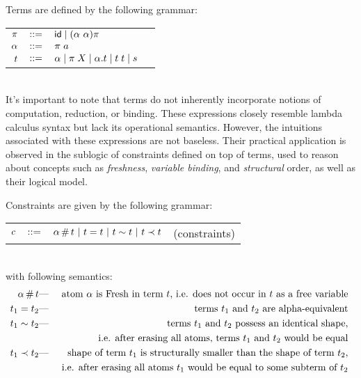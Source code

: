 \documentclass[english, mgr]{iithesis}
\renewcommand{\it}[1]{\textit{#1}}
\begin{document}
Terms are defined by the following grammar:
\\
\begin{tabular}{rclr}
    $\pi$    & $::=$ & $\mathsf{id} \mid (\alpha\ \alpha) \pi$ \\
    $\alpha$ & $::=$ & $\pi \; a$ \\
    $t$    & $::=$ & $\alpha \mid \pi \; X \mid \alpha. t \mid t \; t \mid s$
\end{tabular}
\\

It's important to note that terms do not inherently incorporate notions of computation, reduction, or binding. These expressions closely resemble lambda calculus syntax but lack its operational semantics. However, the intuitions associated with these expressions are not baseless. Their practical application is observed in the sublogic of constraints defined on top of terms, used to reason about concepts such as \it{freshness}, \it{variable binding}, and \it{structural} order, as well as their logical model.

Constraints are given by the following grammar:
\\
\begin{tabular}{rclr}
    $c$  & $::=$ & $\alpha \,\#\, t
                   \ |\  t = t
                   \ |\  t \sim t
                   \ |\  t \prec t$
        & (constraints)
\end{tabular}
\\
with following semantics:
\begin{eqnarray*}
  \alpha \,\#\, t & \text{---} & \text{
    atom $\alpha$ is {Fresh} in term $t$, i.e. does not occur in $t$
    as a free variable
  } \\
  t_1 = t_2 & \text{---} &\text{
    terms $t_1$ and $t_2$ are alpha-equivalent
  } \\
  t_1 \sim t_2 & \text{---} &\text{
    terms $t_1$ and $t_2$ possess an identical shape,
  } \\
  & & \text{
    i.e. after erasing all atoms, terms $t_1$ and $t_2$ would be equal
  } \\
  t_1 \prec t_2 & \text{---} &\text{
    shape of term $t_1$ is structurally smaller than the shape of term
    $t_2$,
  } \\
  & & \text{
    i.e. after erasing all atoms $t_1$ would be equal to some
    subterm of $t_2$
  } \\
\end{eqnarray*}
\end{document}

